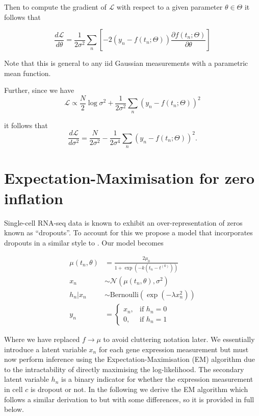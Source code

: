 Then to compute the gradient of $\mathcal{L}$ with respect to a given parameter $\theta \in \Theta$ it follows that


\begin{equation}
\frac{d\mathcal{L}}{d \theta} = \frac{1}{2 \sigma^2} \sum_n
\left[ -2 \left( y_n - f(t_n; \Theta) \right) \frac{\partial f(t_n; \Theta)}{\partial \theta} \right]
\end{equation}


Note that this is general to any iid Gaussian measurements with a parametric mean function.

Further, since we have
\begin{equation}
\mathcal{L} \propto \frac{N}{2} \log \sigma^2 + \frac{1}{2 \sigma^2}
\sum_n \left( y_n - f(t_n; \Theta) \right)^2
\end{equation}

it follows that
\begin{equation}
\frac{d\mathcal{L}}{d \sigma^2} = \frac{N}{2 \sigma^2} - \frac{1}{2 \sigma^4} \sum_n \left( y_n - f(t_n; \Theta) \right)^2.
\end{equation}

\section{Expectation-Maximisation for zero inflation} \label{app:switchdeem}

Single-cell RNA-seq data is known to exhibit an over-representation of zeros known as ``dropouts''. To account for this we propose a model that incorporates dropouts in a similar style to \cite{pierson2015zifa}. Our model becomes

\begin{equation}
\begin{aligned}
\mu(t_n, \theta) & = \frac{2 \mu_0}{1 + \exp\left(-k(t_n - t^{(0)})\right)} \\
x_{n} & \sim \mathcal{N}(\mu(t_n, \theta), \sigma^2) \\
h_{n} | x_{n} & \sim \mathrm{Bernoulli}(\exp(-\lambda x_{n}^2)) \\
    y_{n} &=
\begin{cases}
    x_{n} ,& \text{if } h_{n} = 0\\
    0,  & \text{if } h_{n} = 1
\end{cases}
\end{aligned}
\end{equation}

Where we have replaced $f \rightarrow \mu$ to avoid cluttering notation later. We essentially introduce a latent variable $x_n$ for each gene expression measurement but must now perform inference using the Expectation-Maximisation (EM) algorithm due to the intractability of directly maximising the log-likelihood. The secondary latent variable $h_n$ is a binary indicator for whether the expression measurement in cell $c$ is dropout or not. In the following we derive the EM algorithm which follows a similar derivation to \cite{pierson2015zifa} but with some differences, so it is provided in full below.

